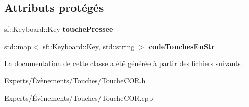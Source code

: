 \subsection*{Attributs protégés}
\begin{DoxyCompactItemize}
\item 
\mbox{\label{class_touche_c_o_r_a6e1284bbe6c15110225f7ebcdfc223e9}} 
sf\+::\+Keyboard\+::\+Key {\bfseries touche\+Pressee}
\item 
\mbox{\label{class_touche_c_o_r_a2e70ff2544676b3744cbeb9c1aa2eb82}} 
std\+::map$<$ sf\+::\+Keyboard\+::\+Key, std\+::string $>$ {\bfseries code\+Touches\+En\+Str}
\end{DoxyCompactItemize}


La documentation de cette classe a été générée à partir des fichiers suivants \+:\begin{DoxyCompactItemize}
\item 
Experts/Évènements/\+Touches/Touche\+C\+O\+R.\+h\item 
Experts/Évènements/\+Touches/Touche\+C\+O\+R.\+cpp\end{DoxyCompactItemize}
